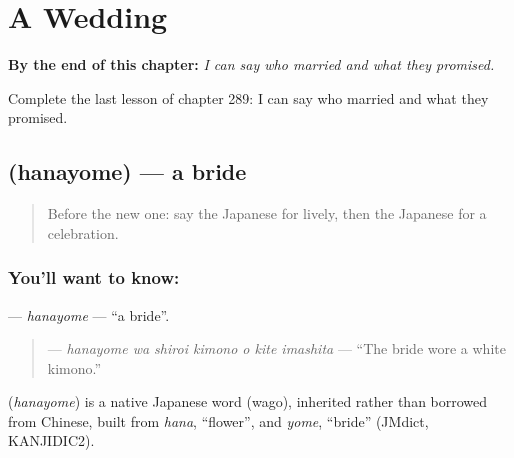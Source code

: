 
\chapter{A Wedding}
\label{ch:ja-a-wedding}

\begin{chapteropening}
\textbf{By the end of this chapter:} \emph{I can say who married and what they promised.}

Complete the last lesson of chapter 289: I can say who married and what they promised.
\end{chapteropening}

\section[\texorpdfstring{\ja{はなよめ} (hanayome)}{はなよめ (hanayome)}]{ (hanayome) — a bride}

\label{lesson:JA-C289-hanayome}



\begin{quote}
Before the new one: say the Japanese for lively, then the Japanese for a celebration.
\end{quote}

\subsection*{You'll want to know: }
\textbf{} — \emph{hanayome} — \textquotedblleft{}a bride\textquotedblright{}.

\begin{quote}
\textbf{   } — \emph{hanayome wa shiroi kimono o kite imashita} — \textquotedblleft{}The bride wore a white kimono.\textquotedblright{}
\end{quote}

\begin{cousinweb}
\textbf{} (\emph{hanayome}) is a native Japanese word (wago), inherited rather than borrowed from Chinese, built from \emph{hana}, \textquotedblleft{}flower\textquotedblright{}, and \emph{yome}, \textquotedblleft{}bride\textquotedblright{} (JMdict, KANJIDIC2).
\end{cousinweb}

